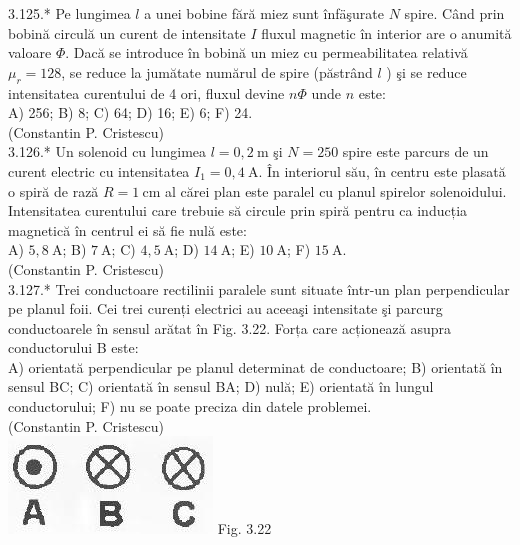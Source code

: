 3.125.* Pe lungimea $l$ a unei bobine fără miez sunt înfäşurate $N$ spire. Când prin bobină circulă un curent de intensitate $I$ fluxul magnetic în interior are o anumită valoare $\Phi$. Dacă se introduce în bobină un miez cu permeabilitatea relativă $\mu_{r}=128$, se reduce la jumătate numărul de spire (păstrând $l$ ) şi se reduce intensitatea curentului de 4 ori, fluxul devine $n \Phi$ unde $n$ este:\\ A) 256; B) 8; C) 64; D) 16; E) 6; F) 24.\\ (Constantin P. Cristescu)\\

3.126.* Un solenoid cu lungimea $l=0,2 \mathrm{~m}$ şi $N=250$ spire este parcurs de un curent electric cu intensitatea $I_{1}=0,4 \mathrm{~A}$. În interiorul său, în centru este plasată o spiră de rază $R=1 \mathrm{~cm}$ al cărei plan este paralel cu planul spirelor solenoidului. Intensitatea curentului care trebuie să circule prin spiră pentru ca inducția magnetică în centrul ei să fie nulă este:\\ A) $5,8 \mathrm{~A}$; B) $7 \mathrm{~A}$; C) $4,5 \mathrm{~A}$; D) $14 \mathrm{~A}$; E) $10 \mathrm{~A}$; F) $15 \mathrm{~A}$.\\ (Constantin P. Cristescu)\\

3.127.* Trei conductoare rectilinii paralele sunt situate într-un plan perpendicular pe planul foii. Cei trei curenți electrici au aceeaşi intensitate şi parcurg conductoarele în sensul arătat în Fig. 3.22. Forța care acționează asupra conductorului B este:\\ A) orientată perpendicular pe planul determinat de conductoare; B) orientată în sensul BC; C) orientată în sensul BA; D) nulă; E) orientată în lungul conductorului; F) nu se poate preciza din datele problemei.\\ (Constantin P. Cristescu)\\ \includegraphics[width=0.4\linewidth]{images/2025_07_01_5b3ff9fa0d508c8e9f17g-171} Fig. 3.22\\

